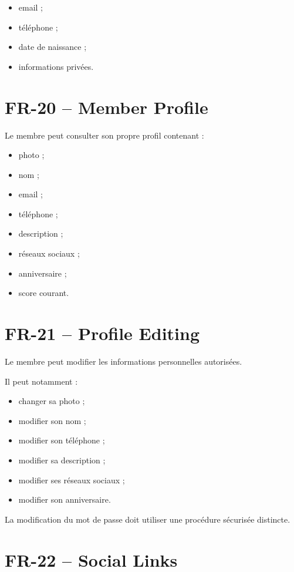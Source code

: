 \documentclass[11pt,a4paper]{report}
\begin{document}
\begin{itemize}
    \item email ;
    \item téléphone ;
    \item date de naissance ;
    \item informations privées.
\end{itemize}

\section{FR-20 -- Member Profile}

Le membre peut consulter son propre profil contenant :

\begin{itemize}
    \item photo ;
    \item nom ;
    \item email ;
    \item téléphone ;
    \item description ;
    \item réseaux sociaux ;
    \item anniversaire ;
    \item score courant.
\end{itemize}

\section{FR-21 -- Profile Editing}

Le membre peut modifier les informations personnelles autorisées.

Il peut notamment :

\begin{itemize}
    \item changer sa photo ;
    \item modifier son nom ;
    \item modifier son téléphone ;
    \item modifier sa description ;
    \item modifier ses réseaux sociaux ;
    \item modifier son anniversaire.
\end{itemize}

La modification du mot de passe doit utiliser une procédure sécurisée distincte.

\section{FR-22 -- Social Links}
\end{document}
